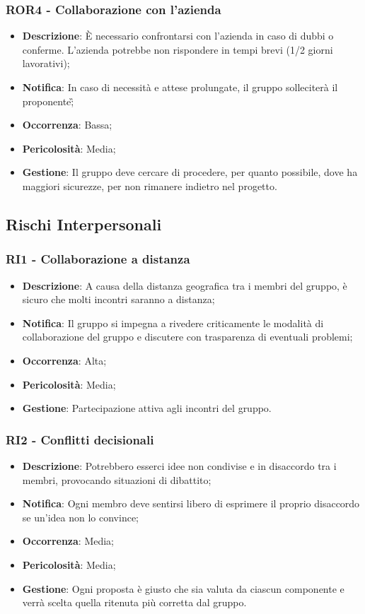 	\subsubsection*{ROR4 - Collaborazione con l'azienda}
	\begin{itemize}
		\item \textbf{Descrizione}: È necessario confrontarsi con l'azienda in caso di dubbi o conferme. L'azienda potrebbe non rispondere in tempi brevi (1/2 giorni lavorativi);
		\item \textbf{Notifica}: In caso di necessità e attese prolungate, il gruppo solleciterà il proponente\G;
		\item \textbf{Occorrenza}: Bassa;
		\item \textbf{Pericolosità}: Media;
		\item \textbf{Gestione}: Il gruppo deve cercare di procedere, per quanto possibile, dove ha maggiori sicurezze, per non rimanere indietro nel progetto.
	\end{itemize}

   \subsection{Rischi Interpersonali}

	\subsubsection*{RI1 - Collaborazione a distanza}
	\begin{itemize}
		\item \textbf{Descrizione}: A causa della distanza geografica tra i membri del gruppo, è sicuro che molti incontri saranno a distanza;
		\item \textbf{Notifica}: Il gruppo si impegna a rivedere criticamente le modalità di collaborazione del gruppo e discutere con trasparenza di eventuali problemi;
		\item \textbf{Occorrenza}: Alta;
		\item \textbf{Pericolosità}: Media;
		\item \textbf{Gestione}: Partecipazione attiva agli incontri del gruppo.
	\end{itemize}

	\subsubsection*{RI2 - Conflitti decisionali}
	\begin{itemize}
		\item \textbf{Descrizione}: Potrebbero esserci idee non condivise e in disaccordo tra i membri, provocando situazioni di dibattito;
		\item \textbf{Notifica}: Ogni membro deve sentirsi libero di esprimere il proprio disaccordo se un'idea non lo convince;
		\item \textbf{Occorrenza}: Media;
		\item \textbf{Pericolosità}: Media;
		\item \textbf{Gestione}: Ogni proposta è giusto che sia valuta da ciascun componente e verrà scelta quella ritenuta più corretta dal gruppo.
	\end{itemize}

